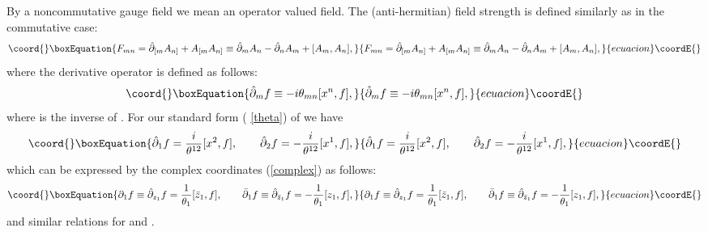 \documentclass[a4paper,a4paper]{article}
\begin{document}
By a noncommutative gauge field \coordHE{} we mean an operator valued field. The
(anti-hermitian) field strength \coordHE{} is defined similarly as in the
commutative case:
\begin{equation}\coord{}\boxEquation{
F_{mn}=\hat\partial_{[m} A_{n]} + A_{[m} A_{n]} \equiv \hat\partial_m A_n -
\hat\partial_n A_m + [A_m, A_n],  \label{F by A}
}{
F_{mn}=\hat\partial_{[m} A_{n]} + A_{[m} A_{n]} \equiv \hat\partial_m A_n -
\hat\partial_n A_m + [A_m, A_n],  }{ecuacion}\coordE{}\end{equation}
where the derivative operator \coordHE{} is defined as follows:
\begin{equation}\coord{}\boxEquation{
\hat\partial_m f \equiv - i \theta_{mn} [x^n, f],
}{
\hat\partial_m f \equiv - i \theta_{mn} [x^n, f],
}{ecuacion}\coordE{}\end{equation}
where \coordHE{} is the inverse of \coordHE{}. For our standard form (%
\ref{theta}) of \coordHE{} we have
\begin{equation}\coord{}\boxEquation{
\hat\partial_1 f = {\frac{i }{\theta^{12}}} [x^2,f], \qquad \hat\partial_2 f
= - {\frac{i }{\theta^{12}}} [x^1,f],
}{
\hat\partial_1 f = {\frac{i }{\theta^{12}}} [x^2,f], \qquad \hat\partial_2 f
= - {\frac{i }{\theta^{12}}} [x^1,f],
}{ecuacion}\coordE{}\end{equation}
which can be expressed by the complex coordinates (\ref{complex}) as
follows:
\begin{equation}\coord{}\boxEquation{
\partial_1 f \equiv \hat\partial_{z_1}f = {\frac{1}{\theta_1}}[\bar z_1, f],
\qquad \bar\partial_1 f \equiv \hat\partial_{\bar z_1}f = - {\frac{1}{
\theta_1}}[z_1, f],
}{
\partial_1 f \equiv \hat\partial_{z_1}f = {\frac{1}{\theta_1}}[\bar z_1, f],
\qquad \bar\partial_1 f \equiv \hat\partial_{\bar z_1}f = - {\frac{1}{
\theta_1}}[z_1, f],
}{ecuacion}\coordE{}\end{equation}
and similar relations for \coordHE{} and \coordHE{}.
\end{document}
